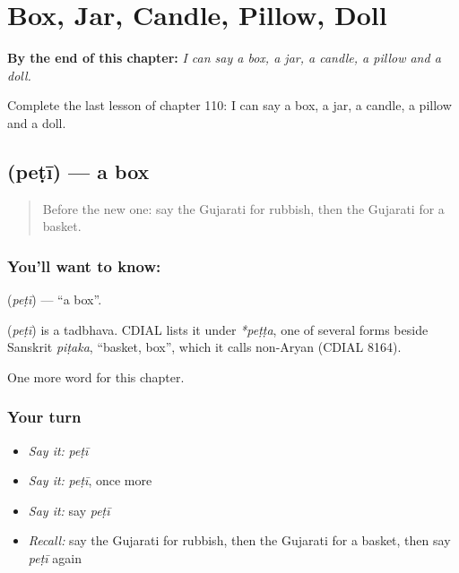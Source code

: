 
\chapter{Box, Jar, Candle, Pillow, Doll}
\label{ch:gu-box-jar-candle-pillow-doll}

\begin{chapteropening}
\textbf{By the end of this chapter:} \emph{I can say a box, a jar, a candle, a pillow and a doll.}

Complete the last lesson of chapter 110: I can say a box, a jar, a candle, a pillow and a doll.
\end{chapteropening}

\section[\texorpdfstring{\gu{પેટી} (peṭī)}{પેટી (peṭī)}]{ (peṭī) — a box}

\label{lesson:GU-C110-peti}



\begin{quote}
Before the new one: say the Gujarati for rubbish, then the Gujarati for a basket.
\end{quote}

\subsection*{You'll want to know: }
\textbf{} (\emph{peṭī}) — \textquotedblleft{}a box\textquotedblright{}.

\begin{cousinweb}
\textbf{} (\emph{peṭī}) is a tadbhava. CDIAL lists it under \emph{*peṭṭa}, one of several forms beside Sanskrit \emph{piṭaka}, \textquotedblleft{}basket, box\textquotedblright{}, which it calls non-Aryan (CDIAL 8164).
\end{cousinweb}

\begin{grammarlens}[title={What you've built}]
One more word for this chapter.
\end{grammarlens}

\subsection*{Your turn}
\begin{itemize}
\raggedright
  \item \emph{Say it:} \emph{peṭī}
  \item \emph{Say it:} \emph{peṭī}, once more
  \item \emph{Say it:} say \emph{peṭī}
  \item \emph{Recall:} say the Gujarati for rubbish, then the Gujarati for a basket, then say \emph{peṭī} again
\end{itemize}


